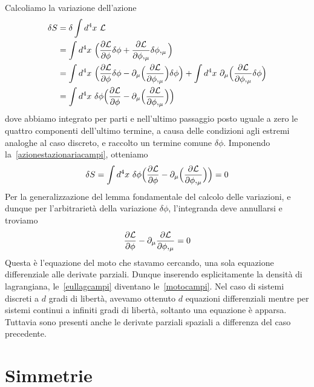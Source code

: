     Calcoliamo la variazione dell'azione
    \begin{equation*}
    \begin{aligned}
        \delta S & = \delta \int d^4 x ~ \mathcal L \\ & = \int d^4 x ~ \Big (\frac{\partial\mathcal L}{\partial\phi} \delta \phi + \frac{\partial\mathcal L}{\partial\phi,_\mu} \delta \phi,_\mu \Big) \\ & = \int d^4 x ~ \Big (\frac{\partial\mathcal L}{\partial\phi} \delta \phi - \partial_\mu \Big (\frac{\partial\mathcal L}{\partial\phi,_\mu} \Big) \delta \phi \Big) + \int d^4 x ~ \partial_\mu \Big ( \frac{\partial\mathcal L}{\partial\phi,_\mu} \delta \phi \Big ) \\ & = \int d^4 x ~ \delta \phi \Big (\frac{\partial\mathcal L}{\partial\phi} - \partial_\mu \Big (\frac{\partial\mathcal L}{\partial\phi,_\mu} \Big) \Big)
    \end{aligned}
    \end{equation*}
    dove abbiamo integrato per parti e nell'ultimo passaggio posto uguale a zero le quattro componenti dell'ultimo termine, a causa delle condizioni agli estremi analoghe al caso discreto, e raccolto un termine comune $\delta \phi$. Imponendo la~\eqref{azionestazionariacampi}, otteniamo
    \begin{equation*}
        \delta S = \int d^4 x ~ \delta \phi \Big (\frac{\partial\mathcal L}{\partial\phi} - \partial_\mu \Big (\frac{\partial\mathcal L}{\partial\phi,_\mu} \Big) \Big)  = 0
    \end{equation*}
    Per la generalizzazione del lemma fondamentale del calcolo delle variazioni, e dunque per l'arbitrarietà della variazione $\delta \phi$, l'integranda deve annullarsi e troviamo
    \begin{equation} \label{eullagcampi}
        \frac{\partial\mathcal L}{\partial\phi} - \partial_\mu \frac{\partial\mathcal L}{\partial\phi,_\mu} = 0
    \end{equation}
    Questa è l'equazione del moto che stavamo cercando, una sola equazione differenziale alle derivate parziali. Dunque inserendo esplicitamente la densità di lagrangiana, le~\eqref{eullagcampi} diventano le~\eqref{motocampi}. Nel caso di sistemi discreti a $d$ gradi di libertà, avevamo ottenuto $d$ equazioni differenziali mentre per sistemi continui a infiniti gradi di libertà, soltanto una equazione è apparsa. Tuttavia sono presenti anche le derivate parziali spaziali a differenza del caso precedente. 

\section{Simmetrie}
    
